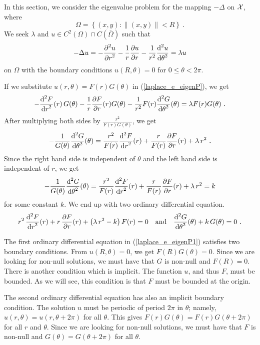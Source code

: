 In this section, we consider the eigenvalue problem for the mapping
$-\Delta$ on $\cal X$, where
\[
  \Omega = \left\{ (x,y) :  \|(x,y)\| < R \right\} \ .
\]
We seek $\lambda$ and
$u \in C^2(\Omega)\cap C(\overline{\Omega})$ such that
\begin{equation} \label{laplace_e_eigenP}
-\Delta u = -\frac{\displaystyle \partial^{2}{u}} {\displaystyle \partial r^{2}} - \frac{1}{r} \frac{\partial{u}}{\partial r}
- \frac{1}{r^2} \frac{\displaystyle \mathrm{d}^{2}{u}} {\displaystyle \mathrm{d}{\theta}^{2}} = \lambda u
\end{equation}
on $\Omega$ with the boundary conditions $u(R,\theta) =0$ for
$0\leq \theta < 2\pi$.

If we substitute $u(r,\theta) = F(r)G(\theta)$ in
(\ref{laplace_e_eigenP}), we get
\[
-\frac{\displaystyle \mathrm{d}^{2}{F}} {\displaystyle \mathrm{d}{r}^{2}}(r)\, G(\theta) - \frac{1}{r} \frac{\partial{F}}{\partial r}(r) G(\theta)
- \frac{1}{r^2} F(r)\frac{\displaystyle \mathrm{d}^{2}{G}} {\displaystyle \mathrm{d}{\theta}^{2}}(\theta) = \lambda F(r)G(\theta) \ .
\]
After multiplying both sides by
$\displaystyle \frac{r^2}{F(r)G(\theta)}$, we get
\[
-\frac{1}{G(\theta)} \frac{\displaystyle \mathrm{d}^{2}{G}} {\displaystyle \mathrm{d}{\theta}^{2}}(\theta) =
\frac{r^2}{F(r)} \frac{\displaystyle \mathrm{d}^{2}{F}} {\displaystyle \mathrm{d}{r}^{2}}(r) + \frac{r}{F(r)} \frac{\partial{F}}{\partial r}(r)
+ \lambda \, r^2 \ .
\]
Since the right hand side is independent of $\theta$ and the left hand side
is independent of $r$, we get
\[
-\frac{1}{G(\theta)} \frac{\displaystyle \mathrm{d}^{2}{G}} {\displaystyle \mathrm{d}{\theta}^{2}}(\theta) =
\frac{r^2}{F(r)} \frac{\displaystyle \mathrm{d}^{2}{F}} {\displaystyle \mathrm{d}{r}^{2}}(r) + \frac{r}{F(r)} \frac{\partial{F}}{\partial r}(r)
+ \lambda \, r^2 = k
\]
for some constant $k$.  We end up with two ordinary differential equation.
\begin{equation} \label{laplace_e_eigenP1}
r^2\,\frac{\displaystyle \mathrm{d}^{2}{F}} {\displaystyle \mathrm{d}{r}^{2}}(r) + r\, \frac{\partial{F}}{\partial r}(r)
+ \left(\lambda \, r^2 -k\right) F(r) = 0 \quad \text{and} \quad
\frac{\displaystyle \mathrm{d}^{2}{G}} {\displaystyle \mathrm{d}{\theta}^{2}}(\theta) + k\,G(\theta) = 0 \  .
\end{equation}

The first ordinary differential equation in
(\ref{laplace_e_eigenP1}) satisfies two boundary
conditions.   From $u(R,\theta) = 0$, we get $F(R)G(\theta)=0$.  Since
we are looking for non-null solutions, we must have that $G$ is
non-null and $F(R)=0$.  There is another condition which is
implicit.  The function $u$, and thus $F$, must be bounded.  As we
will see, this condition is that $F$ must be bounded at the origin.

The second ordinary differential equation has also an implicit
boundary condition.  The solution
$u$ must be periodic of period $2\pi$ in $\theta$; namely,
$u(r,\theta) = u(r,\theta + 2\pi)$ for all $\theta$.  This gives
$F(r)G(\theta) = F(r)G(\theta + 2\pi)$ for all $r$ and $\theta$.
Since we are looking for non-null solutions, we must have that
$F$ is non-null and $G(\theta) = G(\theta + 2\pi)$ for all
$\theta$.

